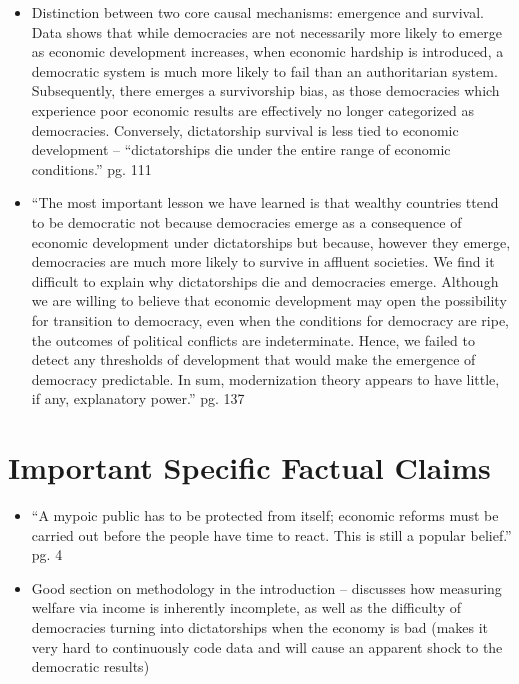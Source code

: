 \documentclass[12pt]{article}
\begin{document}
\begin{itemize}[leftmargin=*, itemsep=4pt]
    \item Distinction between two core causal mechanisms: emergence and survival. Data shows that while democracies are not necessarily more likely to emerge as economic development increases, when economic hardship is introduced, a democratic system is much more likely to fail than an authoritarian system. Subsequently, there emerges a survivorship bias, as those democracies which experience poor economic results are effectively no longer categorized as democracies. Conversely, dictatorship survival is less tied to economic development -- ``dictatorships die under the entire range of economic conditions.'' pg. 111
    \item ``The most important lesson we have learned is that wealthy countries ttend to be democratic not because democracies emerge as a consequence of economic development under dictatorships but because, however they emerge, democracies are much more likely to survive in affluent societies. We find it difficult to explain why dictatorships die and democracies emerge. Although we are willing to believe that economic development may open the possibility for transition to democracy, even when the conditions for democracy are ripe, the outcomes of political conflicts are indeterminate. Hence, we failed to detect any thresholds of development that would make the emergence of democracy predictable. In sum, modernization theory appears to have little, if any, explanatory power.'' pg. 137
\end{itemize}


\section{Important Specific Factual Claims}

\begin{itemize}[leftmargin=*, itemsep=4pt]
    \item ``A mypoic public has to be protected from itself; economic reforms must be carried out before the people have time to react. This is still a popular belief.'' pg. 4
    \item Good section on methodology in the introduction -- discusses how measuring welfare via income is inherently incomplete, as well as the difficulty of democracies turning into dictatorships when the economy is bad (makes it very hard to continuously code data and will cause an apparent shock to the democratic results)
\end{itemize}
\end{document}
